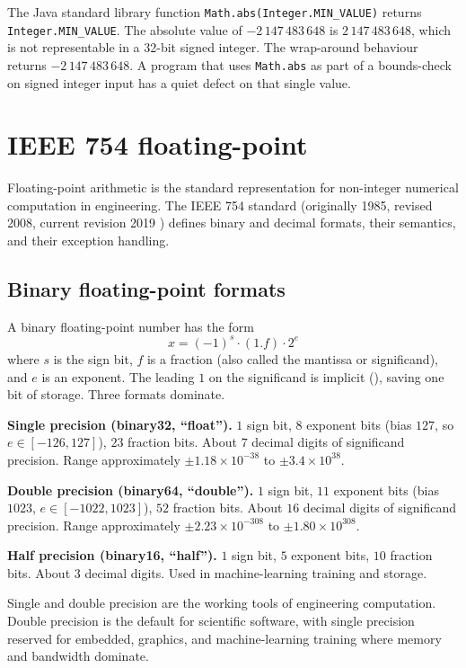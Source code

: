 \begin{example}
The Java standard library function \texttt{Math.abs(Integer.MIN\_VALUE)} returns \texttt{Integer.MIN\_VALUE}. The absolute value of $-2\,147\,483\,648$ is $2\,147\,483\,648$, which is not representable in a 32-bit signed integer. The wrap-around behaviour returns $-2\,147\,483\,648$. A program that uses \texttt{Math.abs} as part of a bounds-check on signed integer input has a quiet defect on that single value.
\end{example}

\section{IEEE 754 floating-point}

Floating-point arithmetic is the standard representation for non-integer numerical computation in engineering. The IEEE 754 standard (originally 1985, revised 2008, current revision 2019 \cite{std:ieee754-2019}) defines binary and decimal formats, their semantics, and their exception handling.

\subsection{Binary floating-point formats}

A binary floating-point number has the form
\[
x = (-1)^s \cdot (1.f) \cdot 2^e
\]
where $s$ is the sign bit, $f$ is a fraction (also called the mantissa or significand), and $e$ is an exponent. The leading $1$ on the significand is implicit (), saving one bit of storage. Three formats dominate.

\textbf{Single precision (binary32, ``float'').} $1$ sign bit, $8$ exponent bits (bias $127$, so $e \in [-126, 127]$), $23$ fraction bits. About $7$ decimal digits of significand precision. Range approximately $\pm 1.18 \times 10^{-38}$ to $\pm 3.4 \times 10^{38}$.

\textbf{Double precision (binary64, ``double'').} $1$ sign bit, $11$ exponent bits (bias $1023$, $e \in [-1022, 1023]$), $52$ fraction bits. About $16$ decimal digits of significand precision. Range approximately $\pm 2.23 \times 10^{-308}$ to $\pm 1.80 \times 10^{308}$.

\textbf{Half precision (binary16, ``half'').} $1$ sign bit, $5$ exponent bits, $10$ fraction bits. About $3$ decimal digits. Used in machine-learning training and storage.

Single and double precision are the working tools of engineering computation. Double precision is the default for scientific software, with single precision reserved for embedded, graphics, and machine-learning training where memory and bandwidth dominate.

